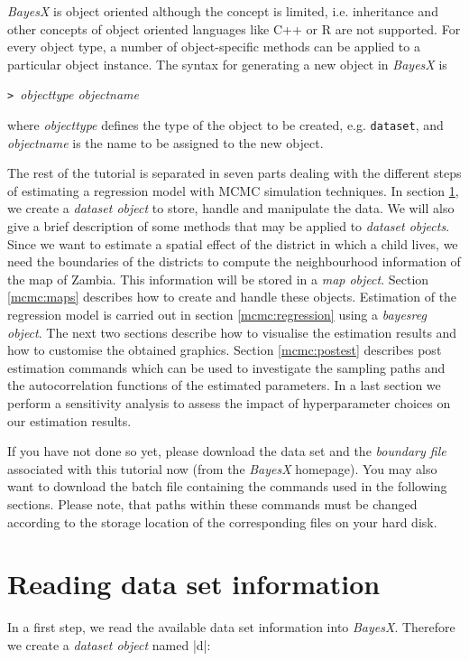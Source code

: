{\it BayesX} is object oriented although the concept is limited, i.e. inheritance and other concepts of object oriented
languages like C++ or R are not supported. For every object type, a number of object-specific methods can be applied to a
particular object instance. The syntax for generating a new object in {\it BayesX} is

{\tt> }{\it objecttype objectname}

where {\it objecttype} defines the type of the object to be created, e.g. {\tt dataset}, and {\it objectname} is the name to be
assigned to the new object.

The rest of the tutorial is separated in seven parts dealing with the different steps of estimating a regression model with
MCMC simulation techniques. In section \ref{mcmc:datasets}, we create a {\it dataset object} to store, handle and manipulate
the data. We will also give a brief description of some methods that may be applied to {\it dataset objects}. Since we want to
estimate a spatial effect of the district in which a child lives, we need the boundaries of the districts to compute the
neighbourhood information of the map of Zambia. This information will be stored in a {\it map object}. Section \ref{mcmc:maps}
describes how to create and handle these objects. Estimation of the regression model is carried out in section
\ref{mcmc:regression} using a {\it bayesreg object}. The next two sections describe how to visualise the estimation results and
how to customise the obtained graphics. Section \ref{mcmc:postest} describes post estimation commands which can be used to
investigate the sampling paths and the autocorrelation functions of the estimated parameters. In a last section we perform a
sensitivity analysis to assess the impact of hyperparameter choices on our estimation results.

If you have not done so yet, please download the data set and the {\it boundary file} associated with this tutorial now (from
the {\it BayesX} homepage). You may also want to download the batch file containing the commands used in the following
sections. Please note, that paths within these commands must be changed according to the storage location of the corresponding
files on your hard disk.

\section{Reading data set information}\label{mcmc:datasets}

In a first step, we read the available data set information into {\it BayesX}. Therefore we create a {\it dataset object} named
|d|:

